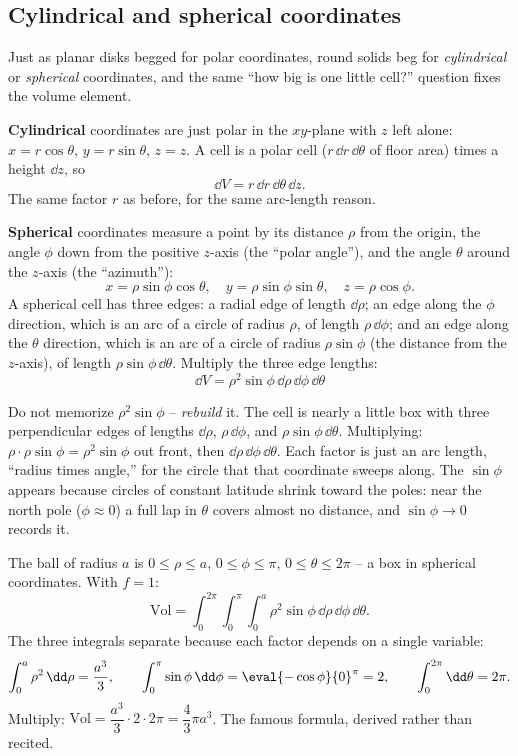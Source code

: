 \subsection{Cylindrical and spherical coordinates}

Just as planar disks begged for polar coordinates, round solids beg for
\emph{cylindrical} or \emph{spherical} coordinates, and the same ``how big is one
little cell?'' question fixes the volume element.

\textbf{Cylindrical} coordinates are just polar in the $xy$-plane with $z$ left
alone: $x=r\cos\theta$, $y=r\sin\theta$, $z=z$. A cell is a polar cell
($r\,\dd r\,\dd\theta$ of floor area) times a height $\dd z$, so
\[
  \dd V=r\,\dd r\,\dd\theta\,\dd z .
\]
The same factor $r$ as before, for the same arc-length reason.

\textbf{Spherical} coordinates measure a point by its distance $\rho$ from the
origin, the angle $\phi$ down from the positive $z$-axis (the ``polar angle''),
and the angle $\theta$ around the $z$-axis (the ``azimuth''):
\[
  x=\rho\sin\phi\cos\theta,\quad
  y=\rho\sin\phi\sin\theta,\quad
  z=\rho\cos\phi .
\]
A spherical cell has three edges: a radial edge of length $\dd\rho$; an edge
along the $\phi$ direction, which is an arc of a circle of radius $\rho$, of
length $\rho\,\dd\phi$; and an edge along the $\theta$ direction, which is an arc
of a circle of radius $\rho\sin\phi$ (the distance from the $z$-axis), of length
$\rho\sin\phi\,\dd\theta$. Multiply the three edge lengths:
\[
  \boxed{\;\dd V=\rho^2\sin\phi\,\dd\rho\,\dd\phi\,\dd\theta\;}
\]

\begin{happeningbox}
Do not memorize $\rho^2\sin\phi$ -- \emph{rebuild} it. The cell is nearly a
little box with three perpendicular edges of lengths $\dd\rho$, $\rho\,\dd\phi$,
and $\rho\sin\phi\,\dd\theta$. Multiplying: $\rho\cdot\rho\sin\phi=\rho^2\sin\phi$
out front, then $\dd\rho\,\dd\phi\,\dd\theta$. Each factor is just an arc length,
``radius times angle,'' for the circle that that coordinate sweeps along. The
$\sin\phi$ appears because circles of constant latitude shrink toward the poles:
near the north pole ($\phi\approx 0$) a full lap in $\theta$ covers almost no
distance, and $\sin\phi\to 0$ records it.
\end{happeningbox}

\begin{example}
\label{ch34:ex-ball}
The ball of radius $a$ is $0\le\rho\le a$, $0\le\phi\le\pi$, $0\le\theta\le 2\pi$
-- a box in spherical coordinates. With $f=1$:
\[
  \text{Vol}=\int_0^{2\pi}\!\int_0^{\pi}\!\int_0^a
     \rho^2\sin\phi\,\dd\rho\,\dd\phi\,\dd\theta .
\]
The three integrals separate because each factor depends on a single variable:
\[
  \int_0^a\rho^2\,\dd\rho=\frac{a^3}{3},\qquad
  \int_0^\pi\sin\phi\,\dd\phi=\eval{-\cos\phi}{0}^{\pi}=2,\qquad
  \int_0^{2\pi}\dd\theta=2\pi .
\]
Multiply: $\text{Vol}=\dfrac{a^3}{3}\cdot 2\cdot 2\pi=\dfrac{4}{3}\pi a^3$. The
famous formula, derived rather than recited.
\end{example}

